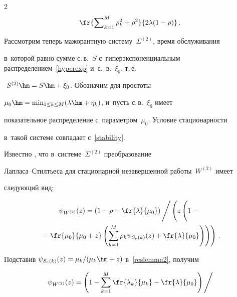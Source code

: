 \begin{multicols}{2}
\begin{equation}
\fr{\sum\nolimits_{k=1}^M \rho_k^2 +\rho^2}{2\lambda (1-\rho)}\,.


\end{equation}








Рассмотрим теперь мажорантную сис\-те\-му~$\Sigma^{(2)}$,  время обслуживания 


в~которой равно сумме с.\,в.~$S$ с~гиперэкспоненциальным распределением~\eqref{hyperexp} и~с.~в.~$\xi_0$, т.\,е.\


 $\ S^{(2)}\hm=S \hm+ \xi_0$. Обозначим для простоты 


$\mu_0\hm=\min\nolimits_{1\le k\le M} (\lambda\hm+\eta_k)$, и~пусть с.\,в.~$\xi_0$ имеет 


показательное распределение  с~па\-ра\-мет\-ром~$\mu_0$. Условие стационарности 


в~такой сис\-те\-ме совпадает с~\eqref{stability}.





Известно \cite{mathematics2022}, что в~сис\-те\-ме~$\Sigma^{(2)}$ преобразование 


Лап\-ла\-са--Стилть\-еса для стационарной незавершенной работы~$W^{(2)}$ имеет 


сле\-ду\-ющий вид:


\begin{multline}


\label{reslemma2}


 \psi_{W^{(2)}} (z)=


 \left(1-\rho- \fr{\lambda}{\mu_0}\right) \Bigg/


\left(  z\left(


\vphantom{\left(\sum\limits_{k=1}^M\right)}


1-{}\right.\right.\\


\left.\left.{}-\fr{\mu_0}{\mu_0+z}\left(\sum\limits_{k=1}^M \rho_k \psi_{S_e(k)}(z) +


\fr{\lambda}{\mu_0}\right)\right)\right)\,.


\end{multline}


Подставив $\psi_{S_e(k)}(z) = \mu_k/(\mu_k \hm+z)$ в~\eqref{reslemma2}, получим


\begin{multline*}


\psi_{W^{(2)}} (z)=


\left(1-\sum\limits_{k=1}^M \fr{\lambda_k}{\mu_k}-\fr{\lambda}{\mu_0}\right) \Bigg/



\end{multline*}
\end{multicols}
